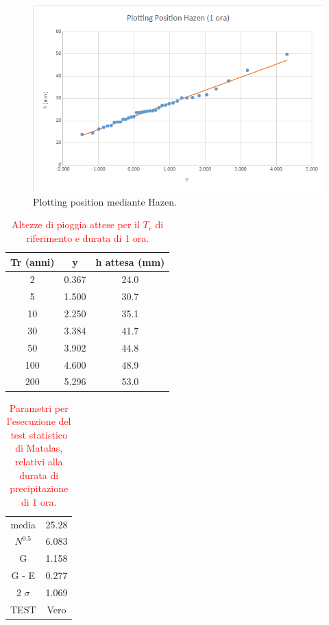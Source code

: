 \begin{figure}[H]\centering
        \includegraphics[scale=.5]{immagini/plot_pos_hazen_1ora.png}
        \caption{Plotting position mediante Hazen.}
      \label{plot_pos_hazen_1ora}
\end{figure}

\begin{table}[H] \centering
    \caption{\textcolor{red}{Altezze di pioggia attese per il $T_r$ di riferimento e durata di 1 ora.}}
        \begin{tabular}{ccc}
        \toprule
        Tr (anni) & y     & h attesa (mm) \\
        \midrule
        2 & 0.367 & 24.0  \\
        5 & 1.500 & 30.7  \\
        10  & 2.250 & 35.1          \\
        30  & 3.384 & 41.7          \\
        50  & 3.902 & 44.8          \\
        100 & 4.600 & 48.9          \\
        200 & 5.296 & 53.0          \\         
        \bottomrule
        \end{tabular}
\end{table}

\begin{table}[H] \centering
    \caption{\textcolor{red}{Parametri per l'esecuzione del test statistico di Matalas, relativi alla durata di precipitazione di 1 ora.}}
    \begin{tabular}{cc}
    \toprule
    media                  & 25.28 \\
    $N ^{0.5}$             &  6.083\\
    G                      & 1.158 \\
    G - E                  &  0.277\\
    2 $\sigma$             & 1.069 \\
    TEST                   & Vero \\
    \bottomrule
    \end{tabular}
\end{table}

